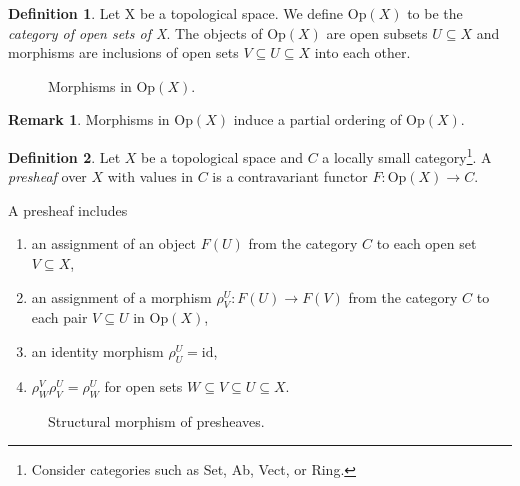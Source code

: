 \documentclass{article}
\theoremstyle{definition}
\newtheorem{definition}{Definition}
\newtheorem*{remark}{Remark}
\begin{document}
\begin{definition}
    Let X be a topological space. We define Op$(X)$ to be the \emph{category of open sets of X}. The objects of Op$(X)$ are open subsets $U \subseteq X$ and morphisms are inclusions of open sets $V \subseteq U \subseteq X$ into each other.

    \begin{figure}[ht]
        \centering
        \caption{Morphisms in Op$(X)$.}
    \end{figure}
\end{definition}

\begin{remark}
    Morphisms in Op$(X)$ induce a partial ordering of Op$(X)$.
\end{remark}

\begin{definition}
    Let $X$ be a topological space and $C$ a locally small category\footnote{Consider categories such as Set, Ab, Vect, or Ring.}. A \emph{presheaf} over $X$ with values in $C$ is a contravariant functor $F:\text{Op}(X) \rightarrow C$.

A presheaf includes
\begin{enumerate}
    \item an assignment of an object $F(U)$ from the category $C$ to each open set $V \subseteq X$,
    \item an assignment of a morphism $\rho_V^U: F(U) \rightarrow F(V)$ from the category $C$ to each pair $V \subseteq U$ in Op$(X)$,
    \item an identity morphism $\rho_U^U = \text{id}$,
    \item $\rho_W^V \rho_V^U= \rho_W^U$ for open sets $W \subseteq V \subseteq U \subseteq X$.
\end{enumerate}

\begin{figure}[h]
    \centering
    \caption{Structural morphism of presheaves.}
\end{figure}
\end{definition}
\end{document}
